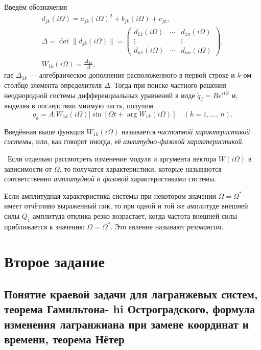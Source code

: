 \documentclass[a4paper,12pt]{article}
\begin{document}
Введём обозначения
\begin{gather*}
	d_{jk}(i\Omega)=a_{jk}(i\Omega)^2+b_{jk}(i\Omega)+c_{jk},\\
	\Delta=\det \|d_{jk}(i\Omega)\|=\begin{pmatrix} d_{11}(i\Omega) &
	\cdots & d_{1n}(i\Omega) \\ \vdots & & \vdots \\ d_{n1}(i\Omega) &
\cdots & d_{nn}(i\Omega)\end{pmatrix} ,\\
W_{1k}(i\Omega)=\frac{\Delta_{1k}}{\Delta},
\end{gather*}
где  $\Delta_{1k}$ --- алгебраическое дополнение расположенного в первой строке
и $k$-ом столбце  элемента определителя $\Delta$.
Тогда при поиске частного решения неоднородной системы дифференциальных уравнений
в виде $\tilde{q}_f=B e ^{i\Omega t}$ и, выделяя в последствии мнимую часть,
получим
\[
	q_k=A |W_{1k}(i\Omega)|\sin[\Omega t +\arg W_{1k}(i\Omega)]
	\quad (k=1,\ldots,\,n)
.\]
\begin{dfn}
	Введённая выше функция $W_{1k}(i\Omega)$ называется \emph{частотной
	характеристикой системы}, или, как говорят иногда, её
	\emph{амлитудно-фазовой
характеристикой}.
\end{dfn}
\begin{dfn}
	 Если отдельно рассмотреть изменение модуля и аргумента вектора
	$W(i\Omega)$ в зависимости от $\Omega$, то получатся характеристики,
	которые называются соответственно \emph{амплитудной} и \emph{фазовой}
	характеристиками системы.
\end{dfn}
\begin{dfn}
	Если амплитудная характеристика системы при некотором значении $\Omega=
	\Omega^*$ 
	имеет отчётливо выраженный пик, то при одной и той же амплитуде
	внешней силы $Q_1$ амплитуда отклика резко возрастает, когда частота
	внешней силы  приближается к значению $\Omega=\Omega^*$. Это явление
	называют \emph{резонансом}.
\end{dfn}
\section*{Второе задание}
\setcounter{subsection}{0}
\subsection{Понятие краевой задачи для лагранжевых систем, теорема Гамильтона-
hi
Остроградского, формула изменения лагранжиана при замене координат и
времени, теорема Нётер}
\end{document}
